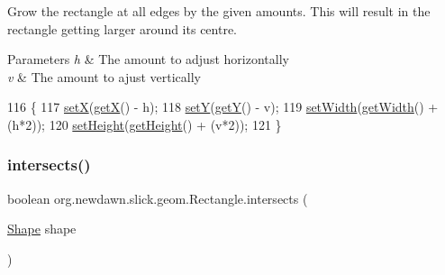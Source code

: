Grow the rectangle at all edges by the given amounts. This will result in the rectangle getting larger around it\textquotesingle{}s centre.


\begin{DoxyParams}{Parameters}
{\em h} & The amount to adjust horizontally \\
\hline
{\em v} & The amount to ajust vertically \\
\hline
\end{DoxyParams}

\begin{DoxyCode}
116                                        \{
117         \mbox{\hyperlink{classorg_1_1newdawn_1_1slick_1_1geom_1_1_shape_a1469b8ef682642c4257869640c27bf16}{setX}}(\mbox{\hyperlink{classorg_1_1newdawn_1_1slick_1_1geom_1_1_shape_a736a47bfdd6f164558b43fd497a3a3f3}{getX}}() - h);
118         \mbox{\hyperlink{classorg_1_1newdawn_1_1slick_1_1geom_1_1_shape_a7a127d0dea9bd7f0e3ce3fd0a61268fc}{setY}}(\mbox{\hyperlink{classorg_1_1newdawn_1_1slick_1_1geom_1_1_shape_a5f334f962d8fc525d522fe0f8ac20b35}{getY}}() - v);
119         \mbox{\hyperlink{classorg_1_1newdawn_1_1slick_1_1geom_1_1_rectangle_a07dc8f2787f4c6d5dfc03fdda3e7d961}{setWidth}}(\mbox{\hyperlink{classorg_1_1newdawn_1_1slick_1_1geom_1_1_rectangle_ae2fddc33461303a9ccf8854c1e93c9c1}{getWidth}}() + (h*2));
120         \mbox{\hyperlink{classorg_1_1newdawn_1_1slick_1_1geom_1_1_rectangle_a0f92d7c72369d28e09ae194b04119e26}{setHeight}}(\mbox{\hyperlink{classorg_1_1newdawn_1_1slick_1_1geom_1_1_rectangle_a6c8878e73b4ca0d7a3c2d4e6bcd421ee}{getHeight}}() + (v*2));
121     \}
\end{DoxyCode}
\mbox{\label{classorg_1_1newdawn_1_1slick_1_1geom_1_1_rectangle_a035c0f753634769b62252fd634342b6f}} 
\subsubsection{\texorpdfstring{intersects()}{intersects()}\hspace{0.1cm}{\footnotesize\ttfamily [1/2]}}
{\footnotesize\ttfamily boolean org.\+newdawn.\+slick.\+geom.\+Rectangle.\+intersects (\begin{DoxyParamCaption}\item[{\mbox{\hyperlink{classorg_1_1newdawn_1_1slick_1_1geom_1_1_shape}{Shape}}}]{shape }\end{DoxyParamCaption})\hspace{0.3cm}{\ttfamily [inline]}}

